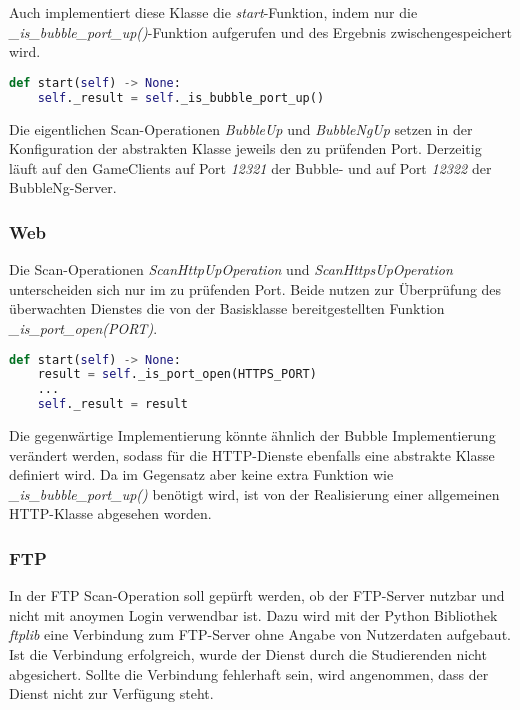 Auch implementiert diese Klasse die \textit{start}-Funktion, indem nur die \textit{\_is\_bubble\_port\_up()}-Funktion aufgerufen und des Ergebnis zwischengespeichert wird.
\begin{lstlisting}[language=Python, frame=single, caption={Big Brother Bubble Scan-Operation}, captionpos=b, label={lst:bigbrother-bubble-up-start}]
def start(self) -> None:
	self._result = self._is_bubble_port_up()
\end{lstlisting} 

Die eigentlichen Scan-Operationen \textit{BubbleUp} und \textit{BubbleNgUp} setzen in der Konfiguration der abstrakten Klasse jeweils den zu prüfenden Port. Derzeitig läuft auf den GameClients auf Port \textit{12321} der Bubble- und auf Port \textit{12322} der BubbleNg-Server.
\subsubsection{Web}

Die Scan-Operationen \textit{ScanHttpUpOperation} und \textit{ScanHttpsUpOperation} unterscheiden sich nur im zu prüfenden Port. Beide nutzen zur Überprüfung des überwachten Dienstes die von der Basisklasse bereitgestellten Funktion \textit{\_is\_port\_open(PORT)}.

\begin{lstlisting}[language=Python, frame=single, caption={Big Brother HTTP(S) Scan-Operation}, captionpos=b, label={lst:bigbrother-http-up}]
def start(self) -> None:
	result = self._is_port_open(HTTPS_PORT)
	...
	self._result = result
\end{lstlisting} 

Die gegenwärtige Implementierung könnte ähnlich der Bubble Implementierung verändert werden, sodass für die HTTP-Dienste ebenfalls eine abstrakte Klasse definiert wird. Da im Gegensatz aber keine extra Funktion wie \textit{\_is\_bubble\_port\_up()} benötigt wird, ist von der Realisierung einer allgemeinen HTTP-Klasse abgesehen worden.

\subsubsection{FTP}
In der FTP Scan-Operation soll gepürft werden, ob der FTP-Server nutzbar und nicht mit anoymen Login verwendbar ist. Dazu wird mit der Python Bibliothek \textit{ftplib} eine Verbindung zum FTP-Server ohne Angabe von Nutzerdaten aufgebaut. Ist die Verbindung erfolgreich, wurde der Dienst durch die Studierenden nicht abgesichert. Sollte die Verbindung fehlerhaft sein, wird angenommen, dass der Dienst nicht zur Verfügung steht. 

